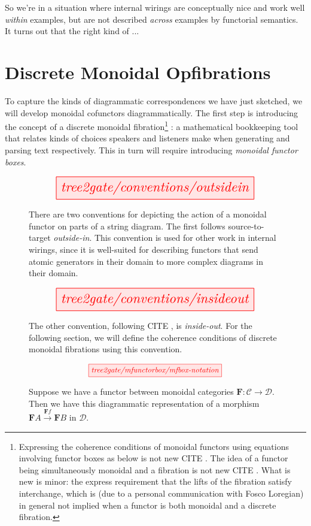 So we're in a situation where internal wirings are conceptually nice and work well \emph{within} examples, but are not described \emph{across} examples by functorial semantics. It turns out that the right kind of ...

\section{Discrete Monoidal Opfibrations}

To capture the kinds of diagrammatic correspondences we have just sketched, we will develop monoidal cofunctors diagrammatically. The first step is introducing the concept of a discrete monoidal fibration\footnote{Expressing the coherence conditions of monoidal functors using equations involving functor boxes as below is not new \bR CITE \e. The idea of a functor being simultaneously monoidal and a fibration is not new \bR CITE \e. What is new is minor: the express requirement that the lifts of the fibration satisfy interchange, which is (due to a personal communication with Fosco Loregian) in general not implied when a functor is both monoidal and a discrete fibration.}
: a mathematical bookkeeping tool that relates kinds of choices speakers and listeners make when generating and parsing text respectively. This in turn will require introducing \emph{monoidal functor boxes}.

\begin{figure}[h!]\label{fig:outsidein}
\centering
\[\resizebox{0.75\textwidth}{!}{\tikzfig{tree2gate/conventions/outsidein}}\]
\caption{There are two conventions for depicting the action of a monoidal functor on parts of a string diagram. The first follows source-to-target \emph{outside-in}. This convention is used for other work in internal wirings, since it is well-suited for describing functors that send atomic generators in their domain to more complex diagrams in their domain.}
\end{figure}

\begin{figure}[h!]\label{fig:insideout}
\centering
\[\resizebox{0.75\textwidth}{!}{\tikzfig{tree2gate/conventions/insideout}}\]
\caption{The other convention, following \bR CITE \e, is \emph{inside-out}. For the following section, we will define the coherence conditions of discrete monoidal fibrations using this convention.}
\end{figure}

\begin{figure}[h!]
\[\resizebox{0.5\textwidth}{!}{\tikzfig{tree2gate/mfunctorbox/mfbox-notation}}\]
\caption{Suppose we have a functor between monoidal categories $\mathbf{F}: \mathcal{C} \rightarrow \mathcal{D}$. Then we have this diagrammatic representation of a morphism $\mathbf{F}A \overset{\mathbf{F}f}{\rightarrow} \mathbf{F}B$ in $\mathcal{D}$.}
\end{figure}

